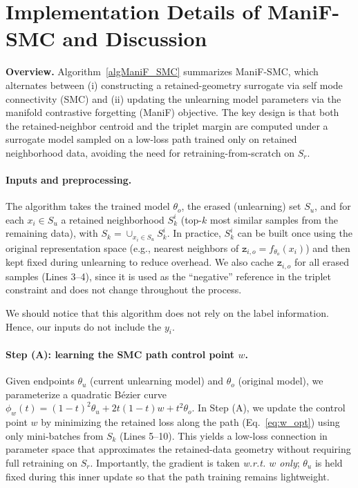  
 
\section{Implementation Details of ManiF-SMC and Discussion} \label{algorithm_appendix}
 

 
\textbf{Overview.}
Algorithm~\ref{algManiF_SMC} summarizes ManiF-SMC, which alternates between (i) constructing a retained-geometry surrogate via self mode connectivity (SMC) and (ii) updating the unlearning model parameters via the manifold contrastive forgetting (ManiF) objective. The key design is that both the retained-neighbor centroid and the triplet margin are computed under a surrogate model sampled on a low-loss path trained only on retained neighborhood data, avoiding the need for retraining-from-scratch on $S_r$.

\paragraph{Inputs and preprocessing.}
The algorithm takes the trained model $\theta_o$, the erased (unlearning) set $S_u$, and for each $x_i\in S_u$ a retained neighborhood $S_k^i$ (top-$k$ most similar samples from the remaining data), with $S_k=\cup_{x_i\in S_u} S_k^i$. In practice, $S_k^i$ can be built once using the original representation space (e.g., nearest neighbors of $\texttt{z}_{i,o}=f_{\theta_o}(x_i)$) and then kept fixed during unlearning to reduce overhead.
We also cache $\texttt{z}_{i,o}$ for all erased samples (Lines 3--4), since it is used as the ``negative'' reference in the triplet constraint and does not change throughout the process.

We should notice that this algorithm does not rely on the label information. Hence, our inputs do not include the $y_i$.

\paragraph{Step (A): learning the SMC path control point $w$.}
Given endpoints $\theta_u$ (current unlearning model) and $\theta_o$ (original model), we parameterize a quadratic B\'ezier curve
$\phi_w(t) = (1-t)^2\theta_u + 2t(1-t)w + t^2\theta_o$.
In Step (A), we update the control point $w$ by minimizing the retained loss along the path (Eq.~\eqref{eq:w_opt}) using only mini-batches from $S_k$ (Lines 5--10). This yields a low-loss connection in parameter space that approximates the retained-data geometry without requiring full retraining on $S_r$. Importantly, the gradient is taken \emph{w.r.t. $w$ only}; $\theta_u$ is held fixed during this inner update so that the path training remains lightweight.

